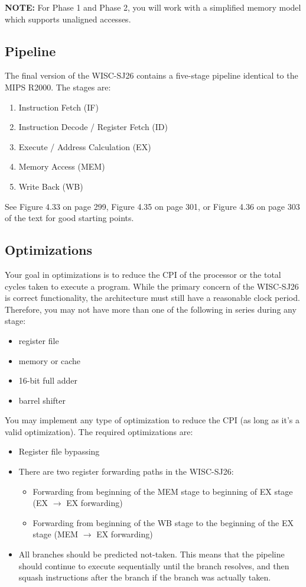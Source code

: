 \documentclass[11pt]{article}
\begin{document}
\textbf{NOTE:} For Phase 1 and Phase 2, you will work with a simplified memory model which supports unaligned accesses.

\subsection{Pipeline}
The final version of the WISC-SJ26 contains a five-stage pipeline identical to the MIPS R2000. The stages are:
\begin{enumerate}
\item Instruction Fetch (IF)
\item Instruction Decode / Register Fetch (ID)
\item Execute / Address Calculation (EX)
\item Memory Access (MEM)
\item Write Back (WB)
\end{enumerate}

See Figure 4.33 on page 299, Figure 4.35 on page 301, or Figure 4.36 on page 303 of the text for good starting points.

\subsection{Optimizations}
Your goal in optimizations is to reduce the CPI of the processor or the total cycles taken to execute a program. While the primary concern of the WISC-SJ26 is correct functionality, the architecture must still have a reasonable clock period. Therefore, you may not have more than one of the following in series during any stage:
\begin{itemize}
\item register file
\item memory or cache
\item 16-bit full adder
\item barrel shifter
\end{itemize}

You may implement any type of optimization to reduce the CPI (as long as it's a valid optimization). The required optimizations are:
\begin{itemize}
\item Register file bypassing
\item There are two register forwarding paths in the WISC-SJ26:
  \begin{itemize}
  \item Forwarding from beginning of the MEM stage to beginning of EX stage (EX $\rightarrow$ EX forwarding)
  \item Forwarding from beginning of the WB stage to the beginning of the EX stage (MEM $\rightarrow$ EX forwarding)
  \end{itemize}
\item All branches should be predicted not-taken. This means that the pipeline should continue to execute sequentially until the branch resolves, and then squash instructions after the branch if the branch was actually taken.
\end{itemize}
\end{document}
